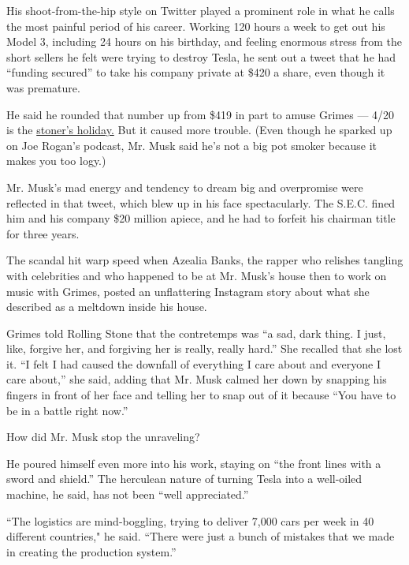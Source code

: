His shoot-from-the-hip style on Twitter played a prominent role in what
he calls the most painful period of his career. Working 120 hours a week
to get out his Model 3, including 24 hours on his birthday, and feeling
enormous stress from the short sellers he felt were trying to destroy
Tesla, he sent out a tweet that he had ``funding secured'' to take his
company private at \$420 a share, even though it was premature.

He said he rounded that number up from \$419 in part to amuse Grimes ---
4/20 is the
\href{https://www.vox.com/policy-and-politics/2019/4/19/18484698/what-is-420-meaning-marijuana-legalization\#:~:text=It's\%204\%2F20\%2C\%20the\%20day,and\%20massive\%20crowds\%20each\%20year.}{stoner's
holiday.} But it caused more trouble. (Even though he sparked up on Joe
Rogan's podcast, Mr. Musk said he's not a big pot smoker because it
makes you too logy.)

Mr. Musk's mad energy and tendency to dream big and overpromise were
reflected in that tweet, which blew up in his face spectacularly. The
S.E.C. fined him and his company \$20 million apiece, and he had to
forfeit his chairman title for three years.

The scandal hit warp speed when Azealia Banks, the rapper who relishes
tangling with celebrities and who happened to be at Mr. Musk's house
then to work on music with Grimes, posted an unflattering Instagram
story about what she described as a meltdown inside his house.

Grimes told Rolling Stone that the contretemps was ``a sad, dark thing.
I just, like, forgive her, and forgiving her is really, really hard.''
She recalled that she lost it. ``I felt I had caused the downfall of
everything I care about and everyone I care about,'' she said, adding
that Mr. Musk calmed her down by snapping his fingers in front of her
face and telling her to snap out of it because ``You have to be in a
battle right now.''

How did Mr. Musk stop the unraveling?

He poured himself even more into his work, staying on ``the front lines
with a sword and shield.'' The herculean nature of turning Tesla into a
well-oiled machine, he said, has not been ``well appreciated.''

``The logistics are mind-boggling, trying to deliver 7,000 cars per week
in 40 different countries," he said. ``There were just a bunch of
mistakes that we made in creating the production system.''

